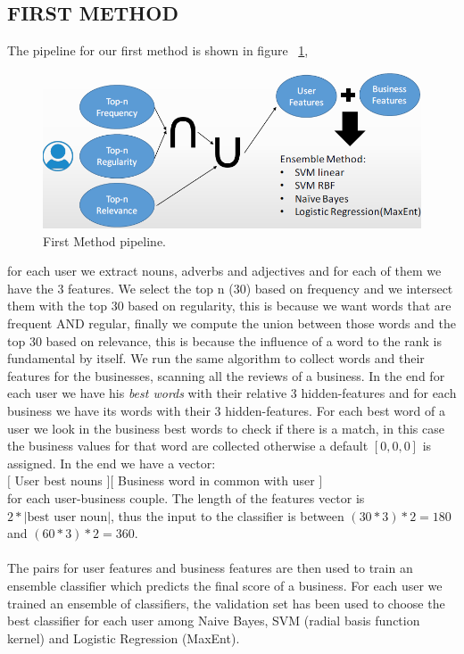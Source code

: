 \documentclass[11pt]{article}
\begin{document}
\subsection{FIRST METHOD}
The pipeline for our first method is shown in figure ~\ref{first},
\begin{figure}[thpb]
	\includegraphics[scale=0.32]{img/firstMethod.png}
	\caption{First Method pipeline.}
	\label{first}
\end{figure}	
for each user we extract nouns, adverbs and adjectives and for each of them 
 we have the 3 features. We select the top n (30) based on frequency and we intersect them with the top 30 based on regularity, this is because we want words that are frequent AND regular, finally we compute the union between those words and the top 30 based on relevance, this is because the influence of a word to the rank is fundamental by itself. 
We run the same algorithm to collect words and their features for the businesses, scanning all the reviews of a business.
In the end for each user we have his\textit{ best words} with their relative 3 hidden-features and for each business we have its words with their 3 hidden-features. For each best word of a user we look in the business best words to check if there is a match, in this case the business values for that word are collected otherwise a default $[0,0,0]$ is assigned.
In the end we have a vector:\\
$[$ User best nouns $]  [$ Business word in common with user $]$\\
for each user-business couple.
The length of the features vector is $2 * |\text{best user noun}|$, thus the input to the classifier is between $(30*3)*2=180$ and $(60*3)*2=360$.\\\\
The pairs for user features and business features are then used to train an ensemble classifier which predicts the final score of a business.
For each user we trained an ensemble of classifiers, the validation set has been used to choose the best classifier for each user among Naive Bayes, SVM (radial basis function kernel) and Logistic Regression (MaxEnt).
\end{document}
